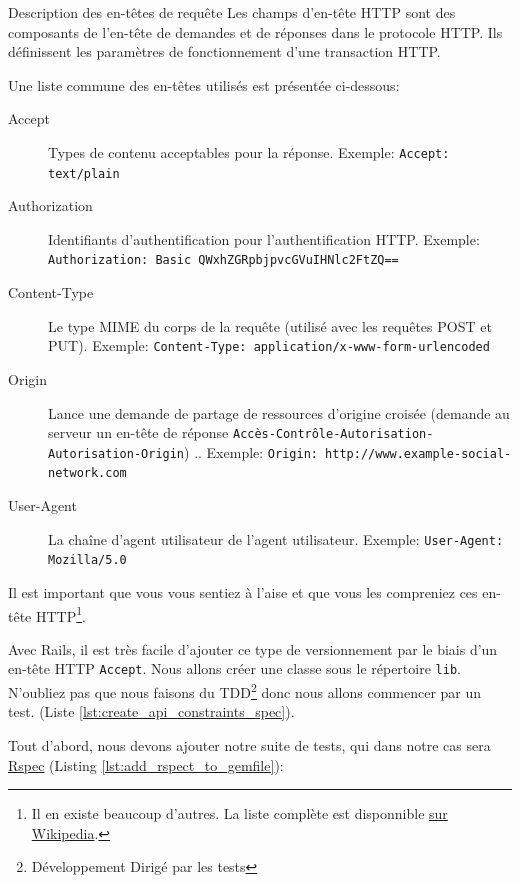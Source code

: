 \documentclass[]{report}
\begin{document}
    \begin{tcolorbox}{Description des en-têtes de requête}\label{box:http_headers}
      Les champs d'en-tête HTTP sont des composants de l'en-tête de demandes et de réponses dans le protocole HTTP. Ils définissent les paramètres de fonctionnement d'une transaction HTTP.

      Une liste commune des en-têtes utilisés est présentée ci-dessous:

      \begin{description}
        \item[Accept] Types de contenu acceptables pour la réponse. Exemple: \verb|Accept: text/plain|
        \item[Authorization] Identifiants d'authentification pour l'authentification HTTP. Exemple: \verb|Authorization: Basic QWxhZGRpbjpvcGVuIHNlc2FtZQ==|
        \item[Content-Type] Le type MIME du corps de la requête (utilisé avec les requêtes POST et PUT). Exemple: \verb|Content-Type: application/x-www-form-urlencoded|
        \item[Origin] Lance une demande de partage de ressources d'origine croisée (demande au serveur un en-tête de réponse \verb|Accès-Contrôle-Autorisation-Autorisation-Origin|) .. Exemple: \verb|Origin: http://www.example-social-network.com|
        \item[User-Agent] La chaîne d'agent utilisateur de l'agent utilisateur. Exemple: \verb|User-Agent: Mozilla/5.0|
      \end{description}

      Il est important que vous vous sentiez à l'aise et que vous les compreniez ces en-tête HTTP\footnote{Il en existe beaucoup d'autres. La liste complète est disponnible \href{https://en.wikipedia.org/wiki/List_of_HTTP_header_fields}{sur Wikipedia}.}.

    \end{tcolorbox}

    Avec Rails, il est très facile d'ajouter ce type de versionnement par le biais d'un en-tête HTTP \verb|Accept|. Nous allons créer une classe sous le répertoire \verb|lib|. N'oubliez pas que nous faisons du TDD\footnote{Développement Dirigé par les tests} donc nous allons commencer par un test. (Liste \ref{lst:create_api_constraints_spec}).

    Tout d'abord, nous devons ajouter notre suite de tests, qui dans notre cas sera \href{http://rspec.info/}{Rspec} (Listing \ref{lst:add_rspect_to_gemfile}):
\end{document}
